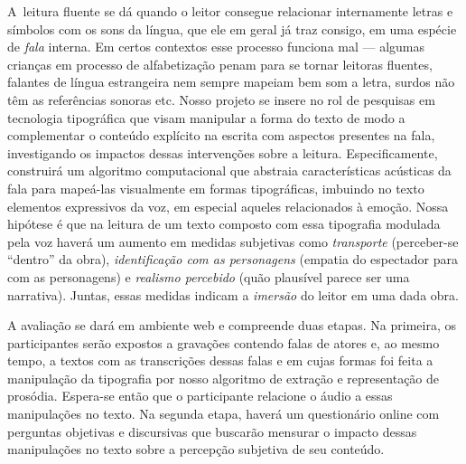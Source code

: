 \documentclass[a4paper,11pt,titlepage,singlespacing]{article}
\begin{document}
\newpage

\abstract

\noindent A~leitura fluente se dá quando o leitor consegue relacionar internamente letras e símbolos com os sons da língua, que ele em geral já traz consigo, em uma espécie de \textit{fala} interna. Em certos contextos esse processo funciona mal — algumas crianças em processo de alfabetização penam para se tornar leitoras fluentes, falantes de língua estrangeira nem sempre mapeiam bem som a letra, surdos não têm as referências sonoras etc. Nosso projeto se insere no rol de pesquisas em tecnologia tipográfica que visam manipular a forma do texto de modo a complementar o conteúdo explícito na escrita com aspectos presentes na fala, investigando os impactos dessas intervenções sobre a leitura. Especificamente, construirá um algoritmo computacional que abstraia características acústicas da fala para mapeá-las visualmente em formas tipográficas, imbuindo no texto elementos expressivos da voz, em especial aqueles relacionados à emoção. Nossa hipótese é que na leitura de um texto composto com essa tipografia modulada pela voz haverá um aumento em medidas subjetivas como \textit{transporte} (perceber-se ``dentro'' da obra), \textit{identificação com as personagens} (empatia do espectador para com as personagens) e \textit{realismo percebido} (quão plausível parece ser uma narrativa). Juntas, essas medidas indicam a \textit{imersão} do leitor em uma dada obra. 

A avaliação se dará em ambiente web e compreende duas etapas. Na primeira, os participantes serão expostos a gravações contendo falas de atores e, ao mesmo tempo, a textos com as transcrições dessas falas e em cujas formas foi feita a manipulação da tipografia por nosso algoritmo de extração e representação de prosódia. Espera-se então que o participante relacione o áudio a essas manipulações no texto. Na segunda etapa, haverá um questionário online com perguntas objetivas e discursivas que buscarão mensurar o impacto dessas manipulações no texto sobre a percepção subjetiva de seu conteúdo.
\end{document}

